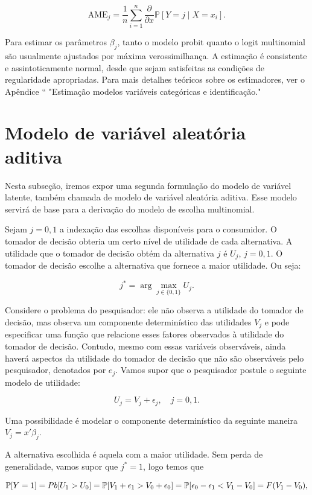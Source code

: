 \documentclass[12pt, a4paper, openany]{book}
\numberwithin{equation}{chapter}
\numberwithin{table}{chapter}
\numberwithin{figure}{chapter}
\theoremstyle{break}
\newcommand{\Pb}{\mathbb{P}}
\begin{document}
\[
\text{AME}_j = \frac{1}{n} \sum_{i=1}^n \frac{\partial}{\partial x} \mathbb{P}[Y = j \mid X = x_i].
\]

Para estimar os parâmetros \( \beta_j \), tanto o modelo probit quanto o logit multinomial são usualmente ajustados por máxima verossimilhança. A estimação é consistente e assintoticamente normal, desde que sejam satisfeitas as condições de regularidade apropriadas. Para mais detalhes teóricos sobre os estimadores, ver o Apêndice `` "Estimação modelos variáveis categóricas e identificação."

\section{Modelo de variável aleatória aditiva}


Nesta subseção, iremos expor uma segunda formulação do modelo de variável latente, também chamada de modelo de variável aleatória aditiva. Esse modelo servirá de base para a derivação do modelo de escolha multinomial.

Sejam \( j = 0, 1 \) a indexação das escolhas disponíveis para o consumidor. O tomador de decisão obteria um certo nível de utilidade de cada alternativa. A utilidade que o tomador de decisão obtém da alternativa \( j \) é \( U_{j} \), \( j = 0, 1 \). O tomador de decisão escolhe a alternativa que fornece a maior utilidade. Ou seja:

\[
j^* = \arg\max_{j \in \{0,1\}} U_{j}.
\]

Considere o problema do pesquisador: ele não observa a utilidade do tomador de decisão, mas observa um componente determinístico das utilidades \( V_j \) e pode especificar uma função que relacione esses fatores observados à utilidade do tomador de decisão. Contudo, mesmo com essas variáveis observáveis, ainda haverá aspectos da utilidade do tomador de decisão que não são observáveis pelo pesquisador, denotados por \( e_{j} \). Vamos supor que o pesquisador postule o seguinte modelo de utilidade:

\[
U_{j} = V_j + \epsilon_{j}, \quad j = 0, 1.
\]

Uma possibilidade é modelar o componente determinístico da seguinte maneira \( V_j = {x}'{\beta}_j \).

A alternativa escolhida é aquela com a maior utilidade. Sem perda de generalidade, vamos supor que \( j^* = 1 \), logo temos que 

\[
\Pb[Y = 1] = \\Pb[U_1 > U_0] 
= \Pb[V_1 + \epsilon_1 > V_0 + \epsilon_0] 
= \Pb[\epsilon_0 - \epsilon_1 < V_1 - V_0] 
= F(V_1 - V_0),
\]
\end{document}
